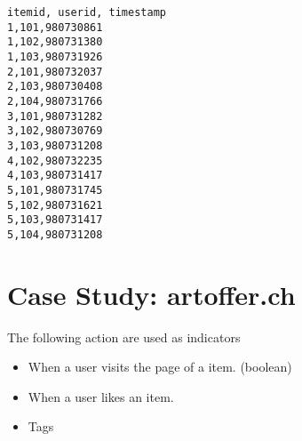 \documentclass[twoside,a4paper]{article}
\begin{document}
\begin{verbatim}
itemid, userid, timestamp
1,101,980730861
1,102,980731380
1,103,980731926
2,101,980732037
2,103,980730408
2,104,980731766
3,101,980731282
3,102,980730769
3,103,980731208
4,102,980732235
4,103,980731417
5,101,980731745
5,102,980731621
5,103,980731417
5,104,980731208
\end{verbatim}


\section{Case Study: artoffer.ch}
\label{sec:artoffer}

The following action are used as indicators
\begin{itemize}
\item When a user visits the page of a item. (boolean)
\item When a user likes an item.
\item Tags
\end{itemize}
\printglossary


\end{document}
